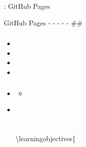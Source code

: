 \hypertarget{section}{%
\section{}\label{section}}

\begin{quote}
\end{quote}

\hypertarget{section-1}{%
\subsection{}\label{section-1}}

\important{}: GitHub Pages

GitHub Pages - - \faSearch  - - \faLightbulb  - \#\#

\hypertarget{section-2}{%
\subsubsection{}\label{section-2}}

\begin{itemize}
\item
  \important{}
\item
  \important{}
\item
  \important{}
\item
  \important{}
\end{itemize}

\hypertarget{section-3}{%
\subsubsection{}\label{section-3}}

\begin{itemize}
\item
  \begin{itemize}
  \tightlist
  \item
  \end{itemize}
\item ~
  \hypertarget{section-4}{%
  \section{}\label{section-4}}

  \textbackslash learningobjectives\{
\end{itemize}

\begin{enumerate}
\def\labelenumi{\arabic{enumi}.}
\item
  \important{}
\item
  \important{}
\item
  \important{}Web
\item
  \important{}
\item
  \important{}

  }
\end{enumerate}

